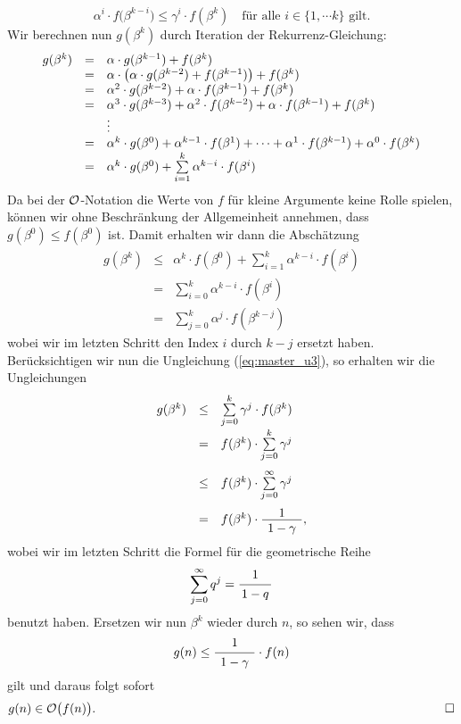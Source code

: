 \begin{enumerate}
\begin{equation}
  \label{eq:master_u3}
\alpha^i \cdot f\bigl(\beta^{k-i}\bigr) \leq \gamma^i \cdot f(\beta^k) 
   \quad \mbox{f\"ur alle $i \in \{1,\cdots k\}$ gilt.}   
\end{equation}
Wir berechnen nun $g(\beta^k)$ durch Iteration der Rekurrenz-Gleichung:
\[
\begin{array}[t]{lcl}
g(\beta^k) & = & \alpha \cdot g(\beta^{k-1}) + f(\beta^k) \\
           & = & \alpha \cdot \bigl(\alpha \cdot g(\beta^{k-2}) + f(\beta^{k-1})\bigr) + f(\beta^k) \\
           & = & \alpha^2 \cdot g(\beta^{k-2}) + \alpha \cdot f(\beta^{k-1}) + f(\beta^k) \\
           & = & \alpha^3 \cdot g(\beta^{k-3}) + 
                 \alpha^2 \cdot f(\beta^{k-2}) + \alpha \cdot f(\beta^{k-1}) + f(\beta^k) \\
           &   & \vdots \\
           & = & \alpha^k \cdot g(\beta^0) + \alpha^{k-1} \cdot f(\beta^1) + \cdots +
                 \alpha^1 \cdot f(\beta^{k-1}) + \alpha^0 \cdot f(\beta^k) \\
           & = & \alpha^k \cdot g(\beta^0) + \sum\limits_{i=1}^{k} \alpha^{k-i} \cdot f(\beta^i)
\end{array}
\]
Da bei der $\mathcal{O}$-Notation die Werte von $f$ f\"ur kleine Argumente keine Rolle spielen,
k\"onnen wir ohne Beschr\"ankung der Allgemeinheit annehmen, dass $g(\beta^0) \leq f(\beta^0)$
ist.  Damit erhalten wir dann die Absch\"atzung
\[ 
\begin{array}{lcl}
g(\beta^k) & \leq & \alpha^k \cdot f(\beta^0) + \sum\limits_{i=1}^{k} \alpha^{k-i} \cdot f(\beta^i) \\[0.3cm]
           & =    & \sum\limits_{i=0}^{k} \alpha^{k-i} \cdot f(\beta^i) \\[0.3cm]
           & =    & \sum\limits_{j=0}^{k} \alpha^{j} \cdot f(\beta^{k-j}) 
\end{array}
\]
wobei wir im letzten Schritt den Index $i$ durch $k-j$ ersetzt haben.  Ber\"ucksichtigen wir
nun die Ungleichung (\ref{eq:master_u3}), so erhalten wir die Ungleichungen
\[
\begin{array}{lcl}
   g(\beta^k) & \leq & \sum\limits_{j=0}^{k} \gamma^j \cdot f(\beta^k) \\[0.3cm]
              & =    & f(\beta^k) \cdot \sum\limits_{j=0}^{k} \gamma^j \\[0.5cm]
              & \leq & f(\beta^k) \cdot \sum\limits_{j=0}^{\infty} \gamma^j \\[0.5cm]
              & =    & f(\beta^k) \cdot \bruch{1}{\;1 - \gamma\;},
\end{array}
\]
wobei wir im letzten Schritt die Formel f\"ur die geometrische Reihe 
\[ \sum\limits_{j=0}^{\infty} q^j = \bruch{1}{1 - q} \]
benutzt haben.  Ersetzen wir nun $\beta^k$ wieder durch $n$, so sehen wir, dass 
\[ g(n) \leq \bruch{1}{\;1 - \gamma\;} \cdot f(n) \]
gilt und daraus folgt sofort
\[ g(n) \in \Oh\bigl(f(n)\bigr). \hspace*{10cm} \Box \]
\end{enumerate}
\vspace*{0.3cm}

